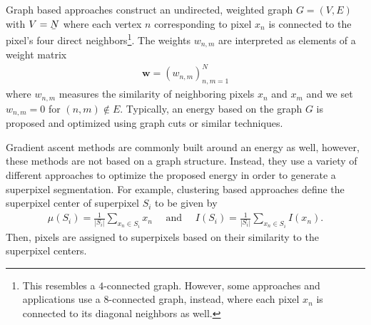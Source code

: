 Graph based approaches construct an undirected, weighted graph $G = (V,E)$ with $V = \ubar{N}$ where each vertex $n$ corresponding to pixel $x_n$ is connected to the pixel's four direct neighbors\footnote{This resembles a $4$-connected graph. However, some approaches and applications use a $8$-connected graph, instead, where each pixel $x_n$ is connected to its diagonal neighbors as well.}. The weights $w_{n,m}$ are interpreted as elements of a weight matrix
\begin{align}
	\boldsymbol{w} = \left (w_{n,m}\right)_{n,m = 1}^N
\end{align}
where $w_{n,m}$ measures the similarity of neighboring pixels $x_n$ and $x_m$ and we set $w_{n,m} = 0$ for $(n,m) \notin E$. Typically, an energy based on the graph $G$ is proposed and optimized using graph cuts or similar techniques.

Gradient ascent methods are commonly built around an energy as well, however, these methods are not based on a graph structure. Instead, they use a variety of different approaches to optimize the proposed energy in order to generate a superpixel segmentation. For example, clustering based approaches define the superpixel center of superpixel $S_i$ to be given by
\begin{align}
	\mu(S_i) = \frac{1}{|S_i|} \sum_{x_n \in S_i} x_n\quad \text{ and }\quad I(S_i) = \frac{1}{|S_i|} \sum_{x_n \in S_i} I(x_n).
\end{align}
Then, pixels are assigned to superpixels based on their similarity to the superpixel centers.


